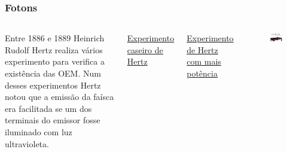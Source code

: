 \documentclass[12pt,brazil]{beamer}
\begin{document}
\begin{frame}
  \frametitle{Fotons}
  
    \begin{columns}[c]


      \column{6cm}
        \fontsize{11pt}{11pt}\selectfont
        
        Entre 1886 e 1889 Heinrich Rudolf Hertz realiza vários experimento para verifica a existência das OEM. Num desses experimentos Hertz notou que a emissão da faísca era facilitada se um dos terminais do emissor fosse iluminado com luz ultravioleta. 
        \vspace*{0.5cm}

        \href{https://youtu.be/9gDFll6Ge7g?t=121}{\color{blue} Experimento caseiro de Hertz}
        \vspace*{0.5cm}
        
        \href{https://youtu.be/SnKKj2bonAI?t=658}{\color{blue} Experimento de Hertz com mais potência}
      
      \column{4cm}
        \vspace*{-2.5cm}
        \begin{figure}
          \includegraphics[width=4.5cm]{figuras/fig12}
        \end{figure}
      
    \end{columns}  
    
\end{frame}


\end{document}
